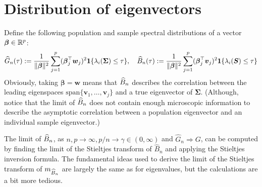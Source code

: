 \documentclass{article}
\newcommand{\bv}{\boldsymbol{v}}
\newcommand{\bw}{\boldsymbol{w}}
\newcommand{\bbeta}{\boldsymbol{\beta}}
\newcommand{\bSigma}{\boldsymbol{\Sigma}}
\newcommand{\bS}{\boldsymbol{S}}
\newcommand{\convweak}{\Rightarrow}
\begin{document}
\section{Distribution of eigenvectors}
Define the following population and sample spectral distributions of a vector $\bbeta \in \Reals^p$:
$$
\wh{G}_n(\tau) := \frac{1}{\|\bbeta\|^2} \sum_{j = 1}^{p} (\bbeta_j^{\top} \bw_j)^2 \1\{\lambda_i(\bSigma) \leq \tau\}, \quad \wh{B}_n(\tau) := \frac{1}{\|\bbeta\|^2} \sum_{j = 1}^{p} (\bbeta_j^{\top} \bv_j)^2 \1\{\lambda_i(\bS) \leq \tau\}
$$ 
Obviously, taking $\bbeta = \bw$ means that $\widehat{B}_n$ describes the correlation between the leading eigenspaces $\mathrm{span}\{\bv_1,\ldots,\bv_j\}$ and a true eigenvector of $\bSigma$. (Although, notice that the limit of $\widehat{B}_n$ does not contain enough microscopic information to describe the asymptotic correlation between a population eigenvector and an individual sample eigenvector.)

The limit of $\widehat{B}_n$, as $n,p \to \infty, p/n \to \gamma \in (0,\infty)$ and $\hat{G}_n \convweak G$, can be computed by finding the limit of the Stieltjes transform of $\hat{B}_n$ and applying the Stieltjes inversion formula. The fundamental ideas used to derive the limit of the Stieltjes transform of $m_{\widehat{B}_n}$ are largely the same as for eigenvalues, but the calculations are a bit more tedious. 
\end{document}
